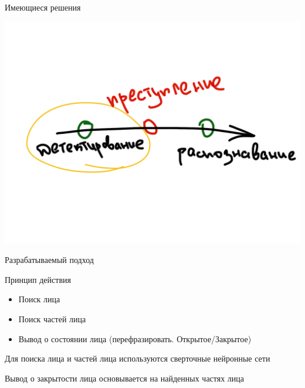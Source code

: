 \documentclass[
  russian,
  ignorenonframetext,
]{beamer}
\providecommand{\tightlist}{%
  \setlength{\itemsep}{0pt}\setlength{\parskip}{0pt}}
\begin{document}
\begin{frame}
\begin{block}{Имеющиеся решения}
\begin{block}{}
\end{block}

\begin{block}{}

\includegraphics{pics/detection.png}

\end{block}

\end{block}

\begin{block}{Разрабатываемый подход}

\begin{block}{Принцип действия}

\begin{itemize}
\tightlist
\item
  Поиск лица
\item
  Поиск частей лица
\item
  Вывод о состоянии лица (перефразировать. Открытое/Закрытое)
\end{itemize}

\end{block}

\begin{block}{Для поиска лица и частей лица используются сверточные
нейронные сети}

\end{block}

\begin{block}{Вывод о закрытости лица основывается на найденных частях
лица}

\end{block}


\end{block}
\end{frame}
\end{document}
